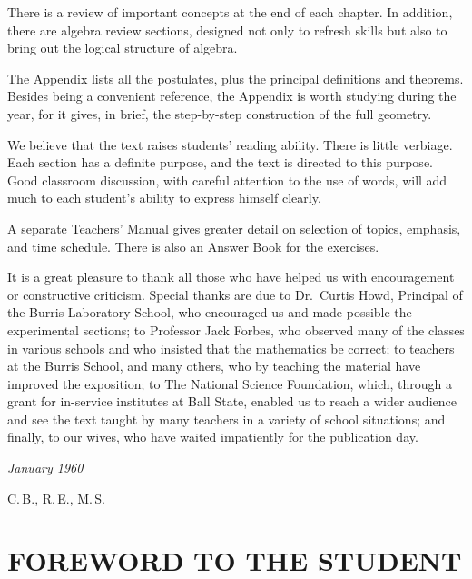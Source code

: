 \documentclass[11pt]{book}
\begin{document}
There is a review of important concepts at the end of each chapter. In addition,
there are algebra review sections, designed not only to refresh skills but also
to bring out the logical structure of algebra.

The Appendix lists all the postulates, plus the principal definitions and
theorems. Besides being a convenient reference, the Appendix is worth studying
during the year, for it gives, in brief, the step-by-step construction of the
full geometry.

We believe that the text raises students' reading ability. There is little
verbiage. Each section has a definite purpose, and the text is directed to this
purpose. Good classroom discussion, with careful attention to the use of words,
will add much to each student's ability to express himself clearly.

A separate Teachers' Manual gives greater detail on selection of topics,
emphasis, and time schedule. There is also an Answer Book for the exercises.

It is a great pleasure to thank all those who have helped us with encouragement
or constructive criticism. Special thanks are due to Dr.\ Curtis Howd, Principal
of the Burris Laboratory School, who encouraged us and made possible the
experimental sections; to Professor Jack Forbes, who observed many of the
classes in various schools and who insisted that the mathematics be correct; to
teachers at the Burris School, and many others, who by teaching the material
have improved the exposition; to The National Science Foundation, which, through
a grant for in-service institutes at Ball State, enabled us to reach a wider
audience and see the text taught by many teachers in a variety of school
situations; and finally, to our wives, who have waited impatiently for the
publication day.

\vspace{1.2em}
\noindent
\begin{minipage}[t]{0.45\linewidth}
\itshape January 1960
\end{minipage}\hfill
\begin{minipage}[t]{0.45\linewidth}
\raggedleft C.\,B., R.\,E., M.\,S.
\end{minipage}

\chapter*{\centering\Large FOREWORD TO THE STUDENT}
\end{document}
